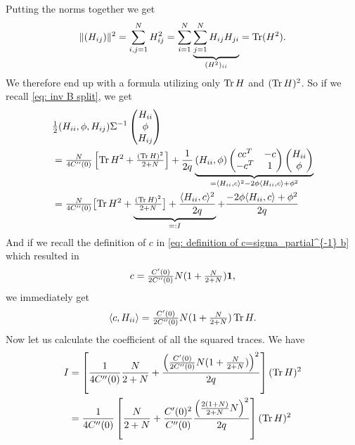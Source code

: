 Putting the norms together we get
\begin{align*}
	\|(H_{ij})\|^2 = \sum_{i,j=1}^N H_{ij}^2
	= \sum_{i=1}^N \underbrace{\sum_{j=1}^N H_{ij}H_{ji}}_{(H^2)_{ii}}
	= \operatorname{Tr}(H^2).
\end{align*}
We therefore end up with a formula utilizing only \(\operatorname{Tr} H\) and \((\operatorname{Tr} H)^2\).
So if we recall \eqref{eq: inv B split}, we get
\begin{align*}
		&\tfrac12
		( H_{ii},\phi, H_{ij} )\Sigma^{-1}
		\begin{pmatrix}
			H_{ii}\\
			\phi\\
			H_{ij}
		\end{pmatrix}\\
		&= \tfrac{N}{4C''(0)}\left[
			\operatorname{Tr} H^2 + \tfrac{(\operatorname{Tr} H)^2}{2+N}
		\right]
		+ \frac1{2q} \underbrace{
			(H_{ii}, \phi)\begin{pmatrix}
			cc^T & -c\\
			-c^T & 1
		\end{pmatrix}
		\begin{pmatrix}
			H_{ii}\\ \phi
		\end{pmatrix}
		}_{
			= \langle H_{ii}, c\rangle^2 - 2\phi \langle H_{ii}, c\rangle + \phi^2
		}\\
		&= \tfrac{N}{4C''(0)}\bigl[
			\operatorname{Tr} H^2 + \underbrace{
				\tfrac{(\operatorname{Tr} H)^2}{2+N}
				\bigr]
				+ \frac{\langle H_{ii}, c\rangle^2}{2q}
			}_{=:I}
		 	+ \frac{- 2\phi \langle H_{ii}, c\rangle + \phi^2}{2q}
\end{align*}
And if we recall the definition of \(c\) in \eqref{eq: definition of
c=sigma_partial^{-1} b} which resulted in
\[
	c=\tfrac{C'(0)}{2C''(0)}N( 1 + \tfrac{N}{2+N} )\mathbf{1},
\]
we immediately get
\[
	\langle c, H_{ii}\rangle = 
	\tfrac{C'(0)}{2C''(0)}N( 1 + \tfrac{N}{2+N} )\operatorname{Tr} H.
\]
Now let us calculate the coefficient of all the squared traces. We have
\begin{align*}
	I &= \left[
		\frac{1}{4C''(0)}\frac{N}{2+N} + 
		\frac{
			\left(\tfrac{C'(0)}{2C''(0)}N( 1 + \tfrac{N}{2+N} )\right)^2
		}{2q}
	\right](\operatorname{Tr} H)^2\\
	&= \frac{1}{4C''(0)}
	\left[
		\frac{N}{2+N} + 
		\frac{C'(0)^2}{C''(0)}\frac{\left(\tfrac{2(1+N)}{2+N}N\right)^2}{2q}
	\right](\operatorname{Tr} H)^2
\end{align*}